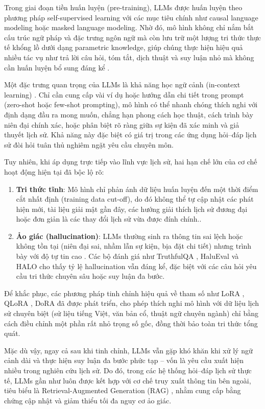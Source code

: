 Trong giai đoạn tiền huấn luyện (pre-training), LLMs được huấn luyện theo phương pháp self-supervised learning với các mục tiêu chính như causal language modeling hoặc masked language modeling\cite{devlin2019bert, radford2019language, brown2020language}. Nhờ đó, mô hình không chỉ nắm bắt cấu trúc ngữ pháp và đặc trưng ngôn ngữ mà còn lưu trữ một lượng tri thức thực tế khổng lồ dưới dạng parametric knowledge, giúp chúng thực hiện hiệu quả nhiều tác vụ như trả lời câu hỏi, tóm tắt, dịch thuật và suy luận nhỏ mà không cần huấn luyện bổ sung đáng kể \cite{bommasani2021opportunities}.

Một đặc trưng quan trọng của LLMs là khả năng học ngữ cảnh (in-context learning) \cite{brown2020language}. Chỉ cần cung cấp vài ví dụ hoặc hướng dẫn chi tiết trong prompt (zero-shot hoặc few-shot prompting), mô hình có thể nhanh chóng thích nghi với định dạng đầu ra mong muốn, chẳng hạn phong cách học thuật, cách trình bày niên đại chính xác, hoặc phân biệt rõ ràng giữa sự kiện đã xác minh và giả thuyết lịch sử. Khả năng này đặc biệt có giá trị trong các ứng dụng hỏi–đáp lịch sử đòi hỏi tuân thủ nghiêm ngặt yêu cầu chuyên môn.

Tuy nhiên, khi áp dụng trực tiếp vào lĩnh vực lịch sử, hai hạn chế lớn của cơ chế hoạt động hiện tại đã bộc lộ rõ:

\begin{enumerate}
    \item \textbf{Tri thức tĩnh}: Mô hình chỉ phản ánh dữ liệu huấn luyện đến một thời điểm cắt nhất định (training data cut-off), do đó không thể tự cập nhật các phát hiện mới, tài liệu giải mật gần đây, các hướng giải thích lịch sử đương đại hoặc đơn giản là các thay đổi lịch sử vừa được đính chính.\cite{lazaridou2021mind}.
    \item \textbf{Ảo giác (hallucination)}: LLMs thường sinh ra thông tin sai lệch hoặc không tồn tại (niên đại sai, nhầm lẫn sự kiện, bịa đặt chi tiết) nhưng trình bày với độ tự tin cao \cite{ji2023survey}. Các bộ đánh giá như TruthfulQA \cite{lin2021truthfulqa}, HaluEval \cite{li2023halueval} và HALO \cite{zhang2023hallucination} cho thấy tỷ lệ hallucination vẫn đáng kể, đặc biệt với các câu hỏi yêu cầu tri thức chuyên sâu hoặc suy luận đa bước.
\end{enumerate}

Để khắc phục, các phương pháp tinh chỉnh hiệu quả về tham số như LoRA \cite{hu2022lora}, QLoRA \cite{dettmers2023qlora}, DoRA \cite{liu2024dora} đã được phát triển, cho phép thích nghi mô hình với dữ liệu lịch sử chuyên biệt (sử liệu tiếng Việt, văn bản cổ, thuật ngữ chuyên ngành) chỉ bằng cách điều chỉnh một phần rất nhỏ trọng số gốc, đồng thời bảo toàn tri thức tổng quát.

Mặc dù vậy, ngay cả sau khi tinh chỉnh, LLMs vẫn gặp khó khăn khi xử lý ngữ cảnh dài và thực hiện suy luận đa bước phức tạp -- vốn là yêu cầu xuất hiện nhiều trong nghiên cứu lịch sử. Do đó, trong các hệ thống hỏi–đáp lịch sử thực tế, LLMs gần như luôn được kết hợp với cơ chế truy xuất thông tin bên ngoài, tiêu biểu là Retrieval-Augmented Generation (RAG) \cite{lewis2020retrieval}, nhằm cung cấp bằng chứng cập nhật và giảm thiểu tối đa nguy cơ ảo giác.
